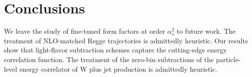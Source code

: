 \section{Conclusions}\label{sec:conclusions}

We leave the study of fine-tuned form factors at order $\alpha_s^2$ to
future work. The treatment of NLO-matched Regge trajectories is
admittedly heuristic. Our results show that light-flavor subtraction
schemes capture the cutting-edge energy correlation function. The
treatment of the zero-bin subtractions of the particle-level energy
correlator of W plus jet production is admittedly heuristic.

